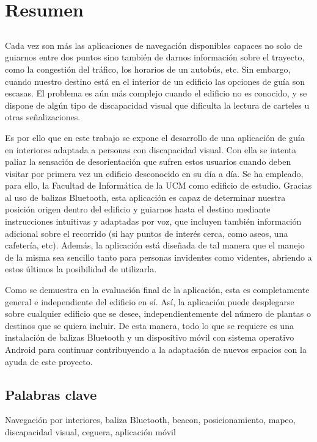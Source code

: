 \chapter*{Resumen}

\section*{}



Cada vez son más las aplicaciones de navegación disponibles capaces no solo de guiarnos entre dos puntos sino también de darnos información sobre el trayecto, como la congestión del tráfico, los horarios de un autobús, etc. Sin embargo, cuando nuestro destino está en el interior de un edificio las opciones de guía son escasas. El problema es aún más complejo cuando el edificio no es conocido, y se dispone de algún tipo de discapacidad visual que dificulta la lectura de carteles u otras señalizaciones.

Es por ello que en este trabajo se expone el desarrollo de una aplicación de guía en interiores adaptada a personas con discapacidad visual. Con ella se intenta paliar la sensación de desorientación que sufren estos usuarios cuando deben visitar por primera vez un edificio desconocido en su día a día. Se ha empleado, para ello, la Facultad de Informática de la UCM como edificio de estudio. Gracias al uso de balizas Bluetooth, esta aplicación es capaz de determinar nuestra posición origen dentro del edificio y guiarnos hasta el destino mediante instrucciones intuitivas y adaptadas por voz, que incluyen también información adicional sobre el recorrido (si hay puntos de interés cerca, como aseos, una cafetería, etc). Además, la aplicación está diseñada de tal manera que el manejo de la misma sea sencillo tanto para personas invidentes como videntes, abriendo a estos últimos la posibilidad de utilizarla.

Como se demuestra en la evaluación final de la aplicación, esta es completamente general e independiente del edificio en sí. Así, la aplicación puede desplegarse sobre cualquier edificio que se desee, independientemente del número de plantas o destinos que se quiera incluir.  De esta manera, todo lo que se requiere es una instalación de balizas Bluetooth y un dispositivo móvil con sistema operativo Android para continuar contribuyendo a la adaptación de nuevos espacios con la ayuda de este proyecto.

\section*{Palabras clave}
   
\noindent Navegación por interiores, baliza Bluetooth, beacon, posicionamiento, mapeo, discapacidad visual, ceguera, aplicación móvil
   


